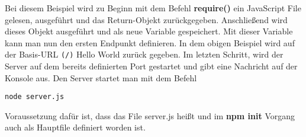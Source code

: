 Bei diesem Beispiel wird zu Beginn mit dem Befehl \textbf{require()} ein JavaScript File gelesen, ausgeführt und das Return-Objekt zurückgegeben. Anschließend wird dieses Objekt ausgeführt und als neue Variable gespeichert. Mit dieser Variable kann man nun den ersten Endpunkt definieren. In dem obigen Beispiel wird auf der Basis-URL \verb|(/)| Hello World zurück gegeben. Im letzten Schritt, wird der Server auf dem bereits definierten Port gestartet und gibt eine Nachricht auf der Konsole aus. Den Server startet man mit dem Befehl
\begin{verbatim}
node server.js
\end{verbatim}
Voraussetzung dafür ist, dass das File server.js heißt und im \textbf{npm init} Vorgang auch als Hauptfile definiert worden ist.
\newline
\cite{creating_basic_server}